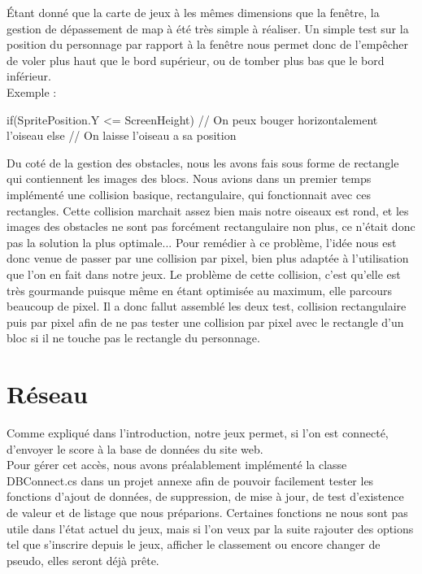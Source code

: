 \documentclass [11pt]{report}
\begin{document}
		\indent Étant donné que la carte de jeux à les mêmes dimensions que la fenêtre, la gestion de dépassement de map à été très simple à réaliser. Un simple test sur la position du personnage par rapport à la fenêtre nous permet donc de l'empêcher de voler plus haut que le bord supérieur, ou de tomber plus bas que le bord inférieur. \\
		
		Exemple :
		
		\begin{mylisting}
		
if(SpritePosition.Y <= ScreenHeight)
{
	// On peux bouger horizontalement l'oiseau
}
else
{
	// On laisse l'oiseau a sa position
}
		\end{mylisting}
	\vspace{10mm}
		
				
		\indent Du coté de la gestion des obstacles, nous les avons fais sous forme de rectangle qui contiennent les images des blocs. Nous avions dans un premier temps implémenté une collision basique, rectangulaire, qui fonctionnait avec ces rectangles. Cette collision marchait assez bien mais notre oiseaux est rond, et les images des obstacles ne sont pas forcément rectangulaire non plus, ce n'était donc pas la solution la plus optimale... 
		Pour remédier à ce problème, l'idée nous est donc venue de passer par une collision par pixel, bien plus adaptée à l'utilisation que l'on en fait dans notre jeux. Le problème de cette collision, c'est qu'elle est très gourmande puisque même en étant optimisée au maximum, elle parcours beaucoup de pixel. Il a donc fallut assemblé les deux test, collision rectangulaire puis par pixel afin de ne pas tester une collision par pixel avec le rectangle d'un bloc si il ne touche pas le rectangle du personnage.
	
	
	\vspace{10mm}
	
	\section{Réseau}
	Comme expliqué dans l'introduction, notre jeux permet, si l'on est connecté, d'envoyer le score à la base de données du site web.\\
	
	Pour gérer cet accès, nous avons préalablement implémenté la classe DBConnect.cs dans un projet annexe afin de pouvoir facilement tester les fonctions d'ajout de données, de suppression, de mise à jour, de test d'existence de valeur et de listage que nous préparions. Certaines fonctions ne nous sont pas utile dans l'état actuel du jeux, mais si l'on veux par la suite rajouter des options tel que s'inscrire depuis le jeux, afficher le classement ou encore changer de pseudo, elles seront déjà prête.\\
	
\end{document}

